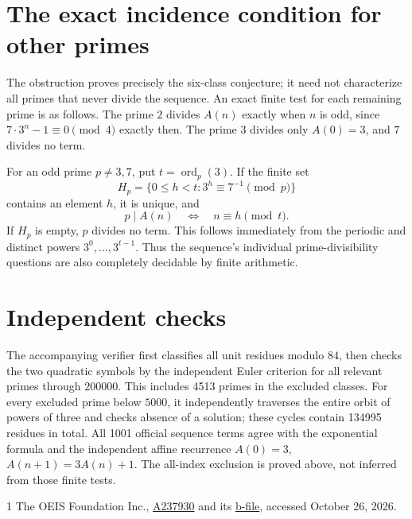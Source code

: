 \documentclass[10pt]{article}
\begin{document}
\section{The exact incidence condition for other primes}
The obstruction proves precisely the six-class conjecture; it
need not characterize all primes that never divide the sequence.
An exact finite test for each remaining prime is as follows.
The prime $2$ divides $A(n)$ exactly when $n$ is odd, since
$7\cdot3^n-1\equiv0\pmod4$ exactly then. The prime $3$ divides
only $A(0)=3$, and $7$ divides no term.

For an odd prime $p\ne3,7$, put $t=\operatorname{ord}_p(3)$.
If the finite set
\[
 H_p=\{0\le h<t:3^h\equiv7^{-1}\pmod p\}
\]
contains an element $h$, it is unique, and
\[
 p\mid A(n)\quad\Longleftrightarrow\quad n\equiv h\pmod t.
\]
If $H_p$ is empty, $p$ divides no term. This follows immediately
from the periodic and distinct powers $3^0,\ldots,3^{t-1}$.
Thus the sequence's individual prime-divisibility questions are
also completely decidable by finite arithmetic.

\section{Independent checks}
The accompanying verifier first classifies all unit residues modulo
$84$, then checks the two quadratic symbols by the independent
Euler criterion for all relevant primes through $200000$.
This includes 4513 primes in the excluded classes.
For every excluded prime below $5000$, it independently traverses
the entire orbit of powers of three and checks absence of a
solution; these cycles contain 134995 residues in total.
All 1001 official sequence terms agree with the exponential formula
and the independent affine recurrence $A(0)=3$,
$A(n+1)=3A(n)+1$. The all-index exclusion is proved above,
not inferred from those finite tests.

\begin{thebibliography}{1}
 The OEIS Foundation Inc.,
\href{https://oeis.org/A237930}{A237930} and its
\href{https://oeis.org/A237930/b237930.txt}{b-file},
accessed October 26, 2026.
\end{thebibliography}
\end{document}
